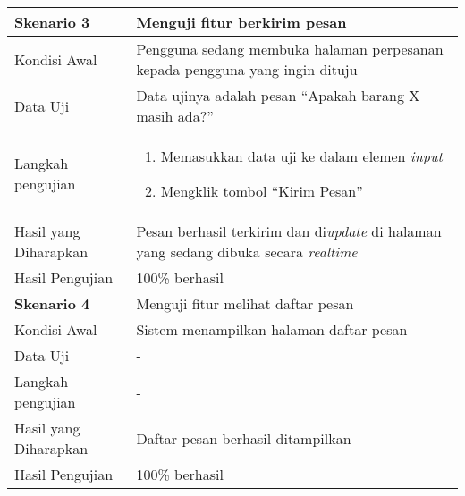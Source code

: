 \begin{longtable}{|X|X|}
		
	\textbf{Skenario 3}
		& Menguji fitur berkirim pesan \\ \hline
	Kondisi Awal
		& Pengguna sedang membuka halaman perpesanan kepada pengguna yang ingin dituju\\ \hline
	Data Uji
		& Data ujinya adalah pesan ``Apakah barang X masih ada?'' \\ \hline
	Langkah pengujian
		& \begin{enumerate}
		\item Memasukkan data uji ke dalam elemen \textit{input} 
		\item Mengklik tombol ``Kirim Pesan''
	\end{enumerate} \\ \hline
	Hasil yang Diharapkan
		& Pesan berhasil terkirim dan di\textit{update} di halaman yang sedang dibuka secara \textit{realtime} \\ \hline
	Hasil Pengujian
		& 100\% berhasil \\ \hline	
		
	\textbf{Skenario 4}
		& Menguji fitur melihat daftar pesan \\ \hline
	Kondisi Awal
		& Sistem menampilkan halaman daftar pesan\\ \hline
	Data Uji
		& -\\ \hline
	Langkah pengujian
		& - \\ \hline
	Hasil yang Diharapkan
		& Daftar pesan berhasil ditampilkan \\ \hline
	Hasil Pengujian
		& 100\% berhasil \\ \hline	
		
\end{longtable}